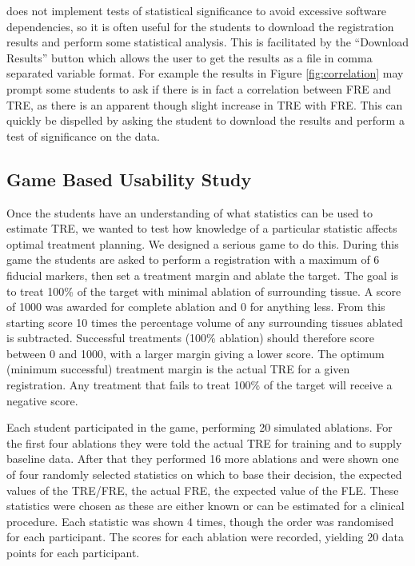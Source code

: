\fred does not implement tests of statistical significance to avoid excessive software dependencies, so it is often 
useful for the students to download the registration results and perform some statistical analysis. This is facilitated by the 
``Download Results'' button which allows the user to get the results as a file in comma separated variable format. 
For example the results in Figure \ref{fig:correlation} may prompt some students to ask if there is in fact a correlation 
between \gls{FRE} and \gls{TRE}, as there is an apparent though slight increase in \gls{TRE} with \gls{FRE}. This can quickly 
be dispelled by asking the student to download the results and perform a test of significance on the data. 

\subsection{Game Based Usability Study}
\label{sec:game_method}
Once the students have an understanding of what statistics can be used to estimate \gls{TRE}, we wanted to test 
how knowledge of a particular statistic affects optimal treatment planning. We designed a serious game to 
do this. During this game the students are asked to perform a registration with a maximum of 
6 fiducial markers, then set a treatment margin and ablate the target. The goal is 
to treat 100\% of the target with minimal ablation of surrounding tissue.
A score of 1000 was awarded for complete ablation and 0 
for anything less. From this starting score 10 times the percentage volume of any
surrounding tissues ablated is subtracted. 
Successful treatments (100\% ablation) should therefore score between 0 and 1000, with a larger margin giving a lower score.
The optimum (minimum successful) treatment
margin is the actual \gls{TRE} for a given registration. 
Any treatment that fails to treat 100\% of the target will receive a negative score. 

Each student participated in the game, performing 20 simulated ablations. For the first four ablations they were told the 
actual \gls{TRE} for training and to supply baseline data. After that they performed 16 more ablations and were shown one of four randomly selected statistics on which to base their decision,
the expected values of the \gls{TRE}/\gls{FRE}, the actual \gls{FRE}, the expected value of the \gls{FLE}. These statistics
were chosen as these are either known or can be estimated for a clinical procedure. Each statistic was shown 4 times, though
the order was randomised for each participant. The scores for each ablation were recorded,  yielding 20 data points for 
each participant.


